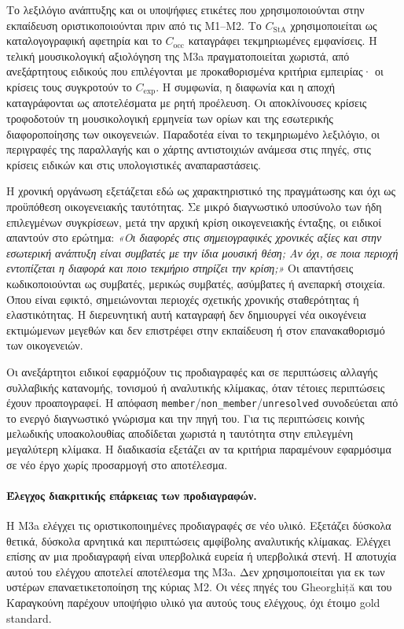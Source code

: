 \documentclass[11pt,a4paper]{article}
\begin{document}
Το λεξιλόγιο ανάπτυξης και οι υποψήφιες ετικέτες που χρησιμοποιούνται στην εκπαίδευση οριστικοποιούνται πριν από τις M1--M2. Το $C_{\mathrm{StA}}$ χρησιμοποιείται ως καταλογογραφική αφετηρία και το $C_{\mathrm{occ}}$ καταγράφει τεκμηριωμένες εμφανίσεις. Η τελική μουσικολογική αξιολόγηση της M3a πραγματοποιείται χωριστά, από ανεξάρτητους ειδικούς που επιλέγονται με προκαθορισμένα κριτήρια εμπειρίας· οι κρίσεις τους συγκροτούν το $C_{\mathrm{exp}}$. Η συμφωνία, η διαφωνία και η αποχή καταγράφονται ως αποτελέσματα με ρητή προέλευση. Οι αποκλίνουσες κρίσεις τροφοδοτούν τη μουσικολογική ερμηνεία των ορίων και της εσωτερικής διαφοροποίησης των οικογενειών. Παραδοτέα είναι το τεκμηριωμένο λεξιλόγιο, οι περιγραφές της παραλλαγής και ο χάρτης αντιστοιχιών ανάμεσα στις πηγές, στις κρίσεις ειδικών και στις υπολογιστικές αναπαραστάσεις.

Η χρονική οργάνωση εξετάζεται εδώ ως χαρακτηριστικό της πραγμάτωσης και όχι ως προϋπόθεση οικογενειακής ταυτότητας. Σε μικρό διαγνωστικό υποσύνολο των ήδη επιλεγμένων συγκρίσεων, μετά την αρχική κρίση οικογενειακής ένταξης, οι ειδικοί απαντούν στο ερώτημα: \emph{«Οι διαφορές στις σημειογραφικές χρονικές αξίες και στην εσωτερική ανάπτυξη είναι συμβατές με την ίδια μουσική θέση; Αν όχι, σε ποια περιοχή εντοπίζεται η διαφορά και ποιο τεκμήριο στηρίζει την κρίση;»} Οι απαντήσεις κωδικοποιούνται ως συμβατές, μερικώς συμβατές, ασύμβατες ή ανεπαρκή στοιχεία. Όπου είναι εφικτό, σημειώνονται περιοχές σχετικής χρονικής σταθερότητας ή ελαστικότητας. Η διερευνητική αυτή καταγραφή δεν δημιουργεί νέα οικογένεια εκτιμώμενων μεγεθών και δεν επιστρέφει στην εκπαίδευση ή στον επανακαθορισμό των οικογενειών.

Οι ανεξάρτητοι ειδικοί εφαρμόζουν τις προδιαγραφές και σε περιπτώσεις αλλαγής συλλαβικής κατανομής, τονισμού ή αναλυτικής κλίμακας, όταν τέτοιες περιπτώσεις έχουν προαπογραφεί. Η απόφαση \texttt{member}/\texttt{non\_member}/\texttt{unresolved} συνοδεύεται από το ενεργό διαγνωστικό γνώρισμα και την πηγή του. Για τις περιπτώσεις κοινής μελωδικής υποακολουθίας αποδίδεται χωριστά η ταυτότητα στην επιλεγμένη μεγαλύτερη κλίμακα. Η διαδικασία εξετάζει αν τα κριτήρια παραμένουν εφαρμόσιμα σε νέο έργο χωρίς προσαρμογή στο αποτέλεσμα.

\paragraph{Έλεγχος διακριτικής επάρκειας των προδιαγραφών.}
Η M3a ελέγχει τις οριστικοποιημένες προδιαγραφές σε νέο υλικό. Εξετάζει δύσκολα θετικά, δύσκολα αρνητικά και περιπτώσεις αμφίβολης αναλυτικής κλίμακας. Ελέγχει επίσης αν μια προδιαγραφή είναι υπερβολικά ευρεία ή υπερβολικά στενή. Η αποτυχία αυτού του ελέγχου αποτελεί αποτέλεσμα της M3a. Δεν χρησιμοποιείται για εκ των υστέρων επαναετικετοποίηση της κύριας M2. Οι νέες πηγές του Gheorghiță και του Καραγκούνη παρέχουν υποψήφιο υλικό για αυτούς τους ελέγχους, όχι έτοιμο gold standard.
\end{document}
